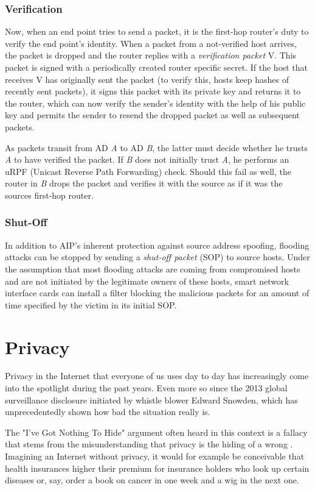 \documentclass{acm_proc_article-sp}
\begin{document}
\subsubsection{Verification}
Now, when an end point tries to send a packet, it is the first-hop router's duty to verify the end point's identity. When a packet from a not-verified host arrives, the packet is dropped and the router replies with a \emph{verification packet} V. This packet is signed with a periodically created router specific secret. If the host that receives V has originally sent the packet (to verify this, hosts keep hashes of recently sent packets), it signs this packet with its private key and returns it to the router, which can now verify the sender's identity with the help of his public key and permits the sender to resend the dropped packet as well as subsequent packets.

As packets transit from AD \emph{A} to AD \emph{B}, the latter must decide whether he trusts \emph{A} to have verified the packet. If \emph{B} does not initially trust \emph{A}, he performs an uRPF (Unicast Reverse Path Forwarding) check. Should this fail as well, the router in \emph{B} drops the packet and verifies it with the source as if it was the sources first-hop router.

\subsubsection{Shut-Off}
In addition to AIP's inherent protection against source address spoofing, flooding attacks can be stopped by sending a \emph{shut-off packet} (SOP) to source hosts. Under the assumption that most flooding attacks are coming from compromised hosts and are not initiated by the legitimate owners of these hosts, smart network interface cards can install a filter blocking the malicious packets for an amount of time specified by the victim in its initial SOP.


\section{Privacy}
\label{sec:priv}
Privacy in the Internet that everyone of us uses day to day has increasingly come into the spotlight during the past years. Even more so since the 2013 global surveillance disclosure initiated by whistle blower Edward Snowden, which has unprecedentedly shown how bad the situation really is.

The "I've Got Nothing To Hide" argument often heard in this context is a fallacy that stems from the misunderstanding that privacy is the hiding of a wrong \cite{solove}. Imagining an Internet without privacy, it would for example be conceivable that health insurances higher their premium for insurance holders who look up certain diseases or, say, order a book on cancer in one week and a wig in the next one.
\end{document}

